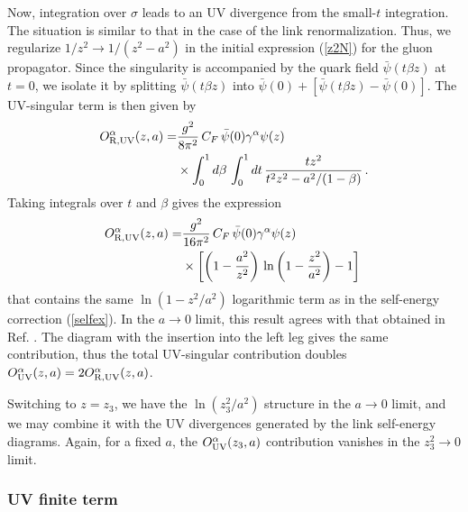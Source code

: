 \documentclass[final,5p,times,twocolumn]{elsarticle}
\newcommand{\nn}{\nonumber \\ }
\begin{document}
Now, integration over $\sigma$
leads to  an UV divergence from the small-$t$ integration.
 The situation is similar to that  in the case of  the  link renormalization.
 Thus, we regularize 
 $1/z^2 \to 1/(z^2-a^2)$ in the initial expression (\ref{z2N}) for the gluon propagator. 
 Since  the singularity is accompanied by the quark field 
 $ \bar  \psi (t \beta z)  $ at  $t=0$, we 
 isolate it by splitting   $\bar  \psi (t \beta z) $  into 
$ \bar  \psi (0)
 + \left [ \bar  \psi (t \beta z)  -  \bar  \psi (0) \right ]
$. The UV-singular term is then given by 
  \begin{align} 
  O^\alpha_ {\rm R, UV}  (z,a) = &  \frac{ g^2}{8 \pi^2} \, C_F \, \bar \psi (0)  \gamma^\alpha  \psi (z)    
  \nonumber \\ &  \times  
   \int_0^1 d \beta \,   \int_0^1 dt\, 
  \frac{t z^2 }{ t ^2z^2-  a^2/(1- \beta) } \,  . 
    \label{UVaR}
 \end{align}
Taking integrals over $t$ and $\beta$    gives the expression 
    \begin{align} 
 O^\alpha_ {\rm R, UV}  (z,a) = &  \frac{ g^2}{16 \pi^2} \, C_F \, \bar \psi (0)  \gamma^\alpha  \psi (z)    \nn  &
  \times \left [  \left (1-\frac{a^2}{z^2}  \right  )  \, 
  \ln  \left (1- \frac{z^2}{a^2} \right  )  -1\right ]
       \  
    \label{UVsing}
 \end{align}
that   contains   the same $ \ln  \left (1- {z^2}/{a^2} \right  ) $  logarithmic  term 
as in the self-energy correction (\ref{selfex}).
In the $a\to 0$ limit, this result agrees with that obtained in Ref. \cite{Ishikawa:2017faj}.
The diagram with  the insertion into  the left leg gives the same contribution, thus the total UV-singular contribution doubles
$
  O^\alpha_ { \rm UV}  (z,a) = 2  O^\alpha_ {\rm R, UV}  (z,a)$.
  
  
Switching  to  $z=z_3$, we have  the $\ln (z_3^2/a^2)$ structure  in the $a\to 0$ limit, 
 and  we  may 
  combine it  with the UV divergences generated by the link self-energy diagrams.
Again, for a fixed $a$,  the $ O^\alpha_ {\rm UV}  (z_3,a) $ 
contribution vanishes in the $z_3^2 \to 0$ limit.

  

 \subsubsection{UV finite  term}

 
\end{document}
